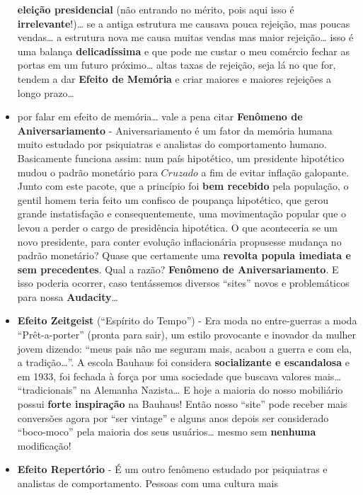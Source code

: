 \documentclass[11pt]{article}
\begin{document}
\begin{itemize}
  \textbf{eleição presidencial} (não entrando no mérito, pois aqui isso
  é \textbf{irrelevante}!)\ldots{} se a antiga estrutura me causava
  pouca rejeição, mas poucas vendas\ldots{} a estrutura nova me causa
  muitas vendas mas maior rejeição\ldots{} isso é uma balança
  \textbf{delicadíssima} e que pode me custar o meu comércio fechar as
  portas em um futuro próximo\ldots{} altas taxas de rejeição, seja lá
  no que for, tendem a dar \textbf{Efeito de Memória} e criar maiores e
  maiores rejeições a longo prazo\ldots{}
\item
  por falar em efeito de memória\ldots{} vale a pena citar
  \textbf{Fenômeno de Aniversariamento} - Aniversariamento é um fator da
  memória humana muito estudado por psiquiatras e analistas do
  comportamento humano. Basicamente funciona assim: num país hipotético,
  um presidente hipotético mudou o padrão monetário para \(Cruzado\) a
  fim de evitar inflação galopante. Junto com este pacote, que a
  princípio foi \textbf{bem recebido} pela população, o gentil homem
  teria feito um confisco de poupança hipotético, que gerou grande
  instatisfação e consequentemente, uma movimentação popular que o levou
  a perder o cargo de presidência hipotética. O que aconteceria se um
  novo presidente, para conter evolução inflacionária propusesse mudança
  no padrão monetário? Quase que certamente uma \textbf{revolta popula
  imediata e sem precedentes}. Qual a razão? \textbf{Fenômeno de
  Aniversariamento}. E isso poderia ocorrer, caso tentássemos diversos
  ``sites'' novos e problemáticos para nossa \textbf{Audacity}\ldots{}
\item
  \textbf{Efeito Zeitgeist} (``Espírito do Tempo'') - Era moda no
  entre-guerras a moda ``Prêt-a-porter'' (pronta para sair), um estilo
  provocante e inovador da mulher jovem dizendo: ``meus pais não me
  seguram mais, acabou a guerra e com ela, a tradição\ldots{}''. A
  escola Bauhaus foi considera \textbf{socializante e escandalosa} e em
  1933, foi fechada à força por uma sociedade que buscava valores
  mais\ldots{} ``tradicionais'' na Alemanha Nazista\ldots{} E hoje a
  maioria do nosso mobiliário possui \textbf{forte inspiração} na
  Bauhaus! Então nosso ``site'' pode receber mais conversões agora por
  ``ser vintage'' e alguns anos depois ser considerado ``boco-moco''
  pela maioria dos seus usuários\ldots{} mesmo sem \textbf{nenhuma}
  modificação!
\item
  \textbf{Efeito Repertório} - É um outro fenômeno estudado por
  psiquiatras e analistas de comportamento. Pessoas com uma cultura mais

\end{itemize}
\end{document}
